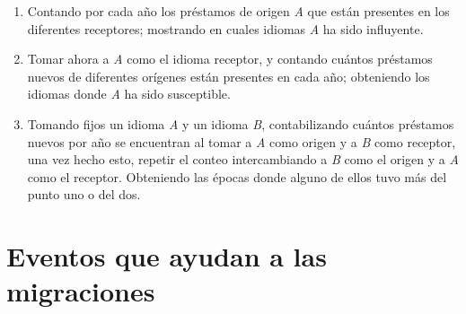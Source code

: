\begin{enumerate}
	\label{proceso.nuevos}
	
\item Contando por cada año los préstamos de origen \textit{A} que están presentes en los diferentes receptores; mostrando en cuales idiomas \textit{A} ha sido influyente.

\item Tomar ahora a \textit{A}  como el idioma receptor, y contando cuántos préstamos nuevos de diferentes orígenes están presentes en cada año; obteniendo los idiomas  donde \textit{A} ha sido susceptible. 


\item Tomando fijos un idioma \textit{A} y un idioma \textit{B}, contabilizando cuántos préstamos nuevos por año se encuentran al tomar a  \textit{A} como origen y a \textit{B} como receptor,  una vez hecho esto,  repetir el conteo intercambiando a \textit{B} como el origen y a \textit{A} como el receptor. Obteniendo las épocas donde alguno de ellos tuvo más del punto uno o del dos. 

\end{enumerate}



\section{Eventos que ayudan a las migraciones} %


